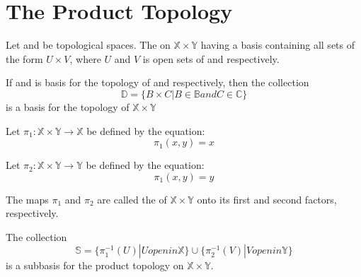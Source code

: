 \section{The Product Topology}

\begin{definition}\label{def:ProductTopology}
      Let  and  be topological spaces. The  on $ \mathbb{X} \times \mathbb{Y} $ having a basis  containing all sets of the form $ U \times V $, where $ U $ and $ V $ is open sets of  and  respectively.
\end{definition}

\begin{theorem}\omitObviuos
      If  and  is basis for the topology of  and  respectively, then the collection
      \begin{equation*}
            \mathbb{D} = \{ B \times C | B \in \mathbb{B} and C \in \mathbb{C} \}
      \end{equation*}
      is a basis for the topology of $ \mathbb{X} \times \mathbb{Y} $
\end{theorem}

\begin{definition}[projection]\label{def:Projection}
      Let $ \pi_{1}: \mathbb{X} \times \mathbb{Y} \rightarrow \mathbb{X} $ be defined by the equation:
      \begin{equation*}
            \pi_{1}(x,y) = x
      \end{equation*} 

      Let $ \pi_{2}: \mathbb{X} \times \mathbb{Y} \rightarrow \mathbb{Y} $ be defined by the equation:
      \begin{equation*}
            \pi_{1}(x,y) = y
      \end{equation*} 

      The maps $ \pi_{1} $ and $ \pi_{2} $ are called the  of $ \mathbb{X} \times \mathbb{Y} $ onto its first and second factors, respectively.
\end{definition}

\begin{theorem}\omitObviuos
      The collection
      \begin{equation*}
            \mathbb{S} = \{ \pi_{1}^{-1}(U) | U open in \mathbb{X} \} \cup \{ \pi_{2}^{-1}(V) | V open in \mathbb{Y} \}
      \end{equation*}
      is a subbasis for the product topology on $ \mathbb{X} \times \mathbb{Y} $.
\end{theorem}

